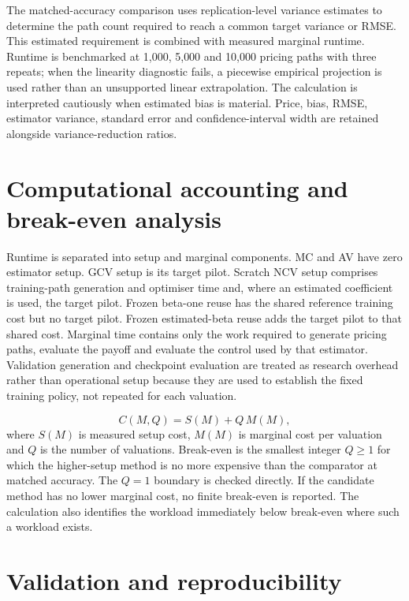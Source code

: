 The matched-accuracy comparison uses replication-level variance estimates to determine the path count required to reach a common target variance or RMSE. This estimated requirement is combined with measured marginal runtime. Runtime is benchmarked at 1{,}000, 5{,}000 and 10{,}000 pricing paths with three repeats; when the linearity diagnostic fails, a piecewise empirical projection is used rather than an unsupported linear extrapolation. The calculation is interpreted cautiously when estimated bias is material. Price, bias, RMSE, estimator variance, standard error and confidence-interval width are retained alongside variance-reduction ratios.

\section{Computational accounting and break-even analysis}

Runtime is separated into setup and marginal components. MC and AV have zero estimator setup. GCV setup is its target pilot. Scratch NCV setup comprises training-path generation and optimiser time and, where an estimated coefficient is used, the target pilot. Frozen beta-one reuse has the shared reference training cost but no target pilot. Frozen estimated-beta reuse adds the target pilot to that shared cost. Marginal time contains only the work required to generate pricing paths, evaluate the payoff and evaluate the control used by that estimator. Validation generation and checkpoint evaluation are treated as research overhead rather than operational setup because they are used to establish the fixed training policy, not repeated for each valuation.

\begin{equation}
C(M,Q) = S(M) + Q\,M(M),
\label{eq:experimental_total_cost}
\end{equation}
where $S(M)$ is measured setup cost, $M(M)$ is marginal cost per valuation and $Q$ is the number of valuations. Break-even is the smallest integer $Q \geq 1$ for which the higher-setup method is no more expensive than the comparator at matched accuracy. The $Q = 1$ boundary is checked directly. If the candidate method has no lower marginal cost, no finite break-even is reported. The calculation also identifies the workload immediately below break-even where such a workload exists.

\section{Validation and reproducibility}

